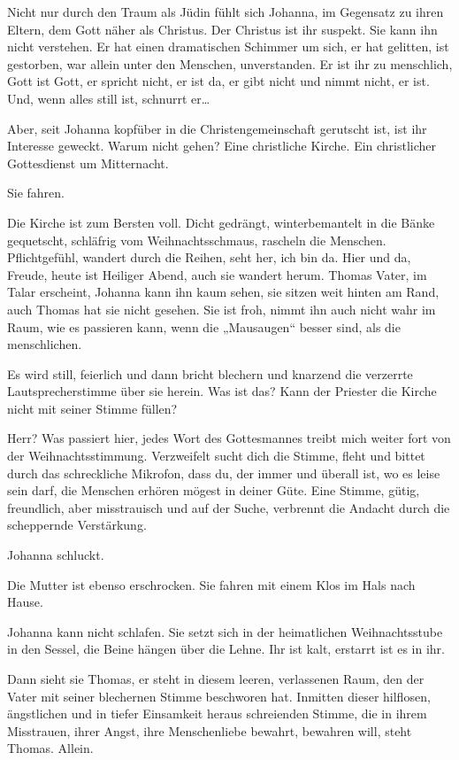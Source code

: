 \documentclass[10pt,titlepage,a5paper]{book}
\begin{document}
Nicht nur durch den Traum als Jüdin fühlt sich Johanna, im Gegensatz zu ihren Eltern, dem Gott näher als Christus. Der Christus ist ihr suspekt. Sie kann ihn nicht verstehen. Er hat einen dramatischen Schimmer um sich, er hat gelitten, ist gestorben, war allein unter den Menschen, unverstanden. Er ist ihr zu menschlich, Gott ist Gott, er spricht nicht, er ist da, er gibt nicht und nimmt nicht, er ist. Und, wenn alles still ist, schnurrt er\dots 

Aber, seit Johanna kopfüber in die Christengemeinschaft gerutscht ist, ist ihr Interesse geweckt. Warum nicht gehen? Eine christliche Kirche. Ein christlicher Gottesdienst um Mitternacht.

Sie fahren.

Die Kirche ist zum Bersten voll. Dicht gedrängt, winterbemantelt in die Bänke gequetscht, schläfrig vom Weihnachtsschmaus, rascheln die Menschen. Pflichtgefühl, wandert durch die Reihen, seht her, ich bin da. Hier und da, Freude, heute ist Heiliger Abend, auch sie wandert herum.
Thomas Vater, im Talar  erscheint, Johanna kann ihn kaum sehen, sie sitzen weit hinten am Rand, auch Thomas hat sie nicht gesehen. Sie ist froh, nimmt ihn auch nicht wahr im Raum, wie es passieren kann, wenn die „Mausaugen“ besser sind, als die menschlichen.

Es wird still, feierlich und dann bricht blechern und knarzend die verzerrte Lautsprecherstimme über sie herein. Was ist das? Kann der Priester die Kirche nicht mit seiner Stimme füllen? 

Herr? Was passiert hier, jedes Wort des Gottesmannes treibt mich weiter fort von der Weihnachtsstimmung. Verzweifelt sucht dich die Stimme, fleht und bittet durch das schreckliche Mikrofon, dass du, der immer und überall  ist, wo es leise sein darf, die Menschen erhören mögest in deiner Güte. Eine Stimme, gütig, freundlich, aber misstrauisch und auf der Suche, verbrennt die Andacht durch die scheppernde Verstärkung.

Johanna schluckt. 

Die Mutter ist ebenso erschrocken. Sie fahren mit einem Klos im Hals nach Hause.

Johanna kann nicht schlafen. Sie setzt sich in der heimatlichen Weihnachtsstube in den Sessel, die Beine hängen über die Lehne. Ihr ist kalt, erstarrt ist es in ihr. 

Dann sieht sie Thomas, er steht in diesem leeren, verlassenen Raum, den der Vater mit seiner blechernen Stimme beschworen hat. Inmitten dieser hilflosen,  ängstlichen und in tiefer Einsamkeit heraus schreienden Stimme, die in ihrem Misstrauen, ihrer Angst, ihre Menschenliebe bewahrt, bewahren will, steht Thomas. Allein. 
\end{document}
